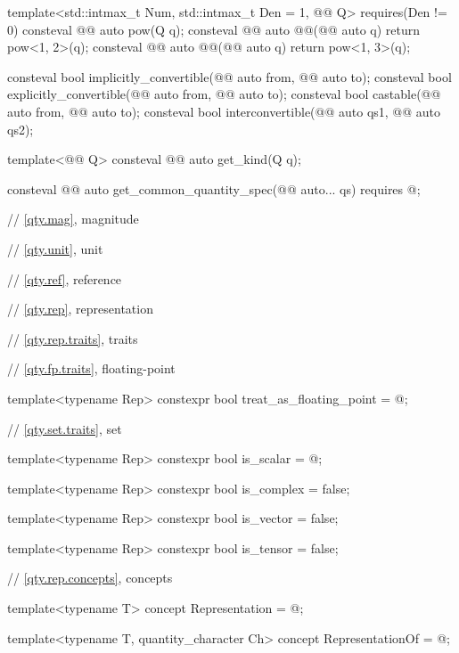 \begin{codeblock}
{template<std::intmax_t Num, std::intmax_t Den = 1, @@ Q>
  requires(Den != 0)
consteval @@ auto pow(Q q);
consteval @@ auto @@(@@ auto q) { return pow<1, 2>(q); }
consteval @@ auto @@(@@ auto q) { return pow<1, 3>(q); }

consteval bool implicitly_convertible(@@ auto from, @@ auto to);
consteval bool explicitly_convertible(@@ auto from, @@ auto to);
consteval bool castable(@@ auto from, @@ auto to);
consteval bool interconvertible(@@ auto qs1, @@ auto qs2);

template<@@ Q>
consteval @@ auto get_kind(Q q);

consteval @@ auto get_common_quantity_spec(@@ auto... qs)
  requires @\seebelownc@;

// \ref{qty.mag}, magnitude

// \ref{qty.unit}, unit

// \ref{qty.ref}, reference

// \ref{qty.rep}, representation

// \ref{qty.rep.traits}, traits

// \ref{qty.fp.traits}, floating-point

template<typename Rep>
constexpr bool treat_as_floating_point = @\seebelownc@;

// \ref{qty.set.traits}, set

template<typename Rep>
constexpr bool is_scalar = @\seebelownc@;

template<typename Rep>
constexpr bool is_complex = false;

template<typename Rep>
constexpr bool is_vector = false;

template<typename Rep>
constexpr bool is_tensor = false;

// \ref{qty.rep.concepts}, concepts

template<typename T>
concept Representation = @\seebelownc@;

template<typename T, quantity_character Ch>
concept RepresentationOf = @\seebelownc@;

}
\end{codeblock}
